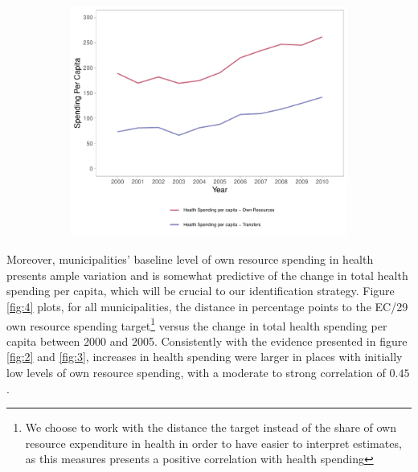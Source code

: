 \begin{figure}[h]
\begin{center}
\begin{subfigure}{0.45\textwidth}
        \centering
        \includegraphics[width=\textwidth]{plots/plot_siops_level_source_top.pdf}
    \end{subfigure}
    \end{center}\vspace{+1pt}
\end{figure}


Moreover, municipalities' baseline level of own resource spending in health presents ample variation and is somewhat predictive of the change in total health spending per capita, which will be crucial to our identification strategy. Figure \ref{fig:4} plots, for all municipalities, the distance in percentage points to the EC/29 own resource spending target\footnote{We choose to work with the distance the target instead of the share of own resource expenditure in health in order to have easier to interpret estimates, as this measures presents a positive correlation with health spending} versus the change in total health spending per capita between 2000 and 2005. Consistently with the evidence presented in figure \ref{fig:2} and \ref{fig:3}, increases in health spending were larger in places with initially low levels of own resource spending, with a moderate to strong correlation of $0.45$.



